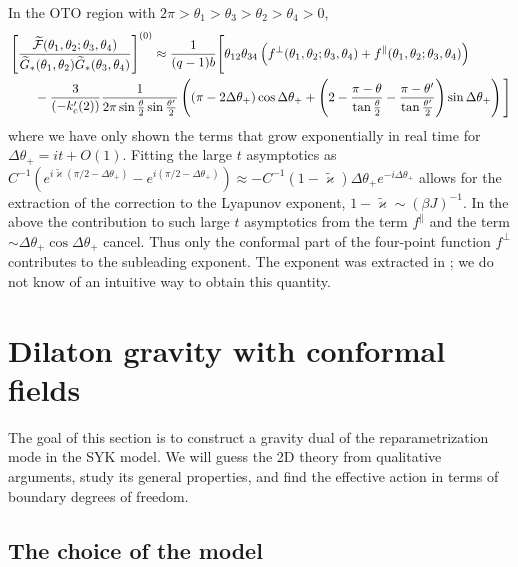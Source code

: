 \documentclass[12pt]{article}
\newcommand{\kap}{\varkappa}
\newcommand{\calF}{\mathcal{F}}
\newcommand{\tG}{\widetilde{G}}
\newcommand{\tF}{\widetilde{\calF}}
\newcommand{\tkap}{\tilde{\kap}}
\newcommand{\tht}{\theta}
\newcommand{\De}{\Delta}
\newcommand{\ov}{\over}
\begin{document}
In the OTO region with $2\pi > \tht_1 > \tht_3 > \tht_2 > \tht_4>0$, 
\begin{equation}
\begin{aligned}
&\left[{\tF(\tht_1, \tht_2; \tht_3, \tht_4) \ov \tG_*(\tht_1, \tht_2)\tG_*(\tht_3, \tht_4)}\right]^{(0)}\approx {1 \ov (q-1)b}\Bigg[ \tht_{12}\tht_{34}\left( f^{\perp}(\tht_1, \tht_2; \tht_3, \tht_4) + f^{\parallel}(\tht_1, \tht_2; \tht_3, \tht_4)\right)
\\
&\hspace{20pt}-{3 \ov (-k'_c(2))}{1 \ov 2\pi\sin{\tht \ov 2}\sin{\tht' \ov 2}}\left( (\pi- 2 \De \tht_+)\cos \De \tht_+ + \left( 2-{\pi-\tht \ov \tan{\tht \ov 2}}-{\pi-\tht' \ov \tan {\tht' \ov 2}}\right)\sin \De \tht_+\right)\Bigg]
\end{aligned}
\end{equation}
where we have only shown the terms that grow exponentially in real time for $\Delta\theta_+=it+O(1)$. Fitting the large $t$ asymptotics as $C^{-1}(e^{i\tkap(\pi/2-\Delta\theta_+)}-e^{i(\pi/2-\Delta\theta_+)}) \approx -C^{-1}(1-\tkap)\Delta\theta_{+}e^{-i\Delta\theta_+}$ allows for the extraction of the correction to the Lyapunov exponent, $1-\tkap\sim(\beta J)^{-1}$. In the above the contribution to such large $t$ asymptotics from the term $f^{\parallel}$ and the term $\sim \De \tht_+ \cos \De \tht_+$ cancel. Thus only the conformal part of the four-point function $f^{\perp}$ contributes to the subleading exponent. The exponent was extracted in \cite{MS16}; we do not know of an intuitive way to obtain this quantity.



\section{Dilaton gravity with conformal fields}

The goal of this section is to construct a gravity dual of the reparametrization mode in the SYK model. We will guess the 2D theory from qualitative arguments, study its general properties, and find the effective action in terms of boundary degrees of freedom.

\subsection{The choice of the model}
\end{document}
